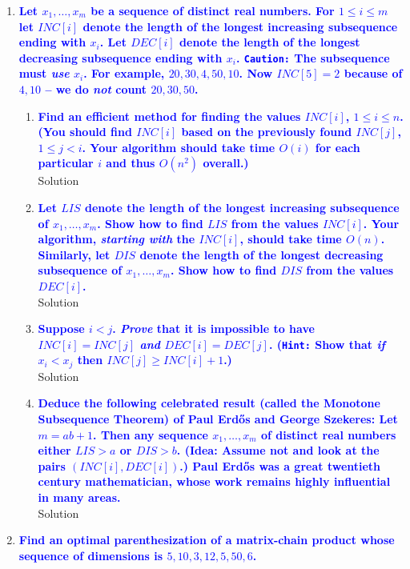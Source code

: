 \documentclass[11pt]{article}
\begin{document}
\begin{enumerate}
    
\item \textbf{\textcolor{blue}{Let $x_1,\ldots,x_m$ be a sequence of distinct real numbers. For $1\leq i\leq m$ let $INC[i]$ denote the length of the longest
increasing subsequence ending with $x_i$.  Let $DEC[i]$ denote the 
length of the longest decreasing subsequence ending with $x_i$.  
{\tt Caution:} The subsequence must {\em use} $x_i$.  For example,
$20,30,4,50, 10$.  Now $INC[5]=2$ because of $4,10$ -- we do
{\em not} count $20,30,50$.}}
    \begin{enumerate}
    \item \textbf{\textcolor{blue}{Find an efficient method for finding the values $INC[i]$, $1\leq i\leq n$. (You should find $INC[i]$ based on the previously found $INC[j]$, $1\leq j< i$.  Your algorithm should take time $O(i)$ for each
    particular $i$ and thus $O(n^2)$ overall.)}}
        \\ Solution
    \item \textbf{\textcolor{blue}{Let $LIS$ denote the length of the longest increasing subsequence of $x_1,\ldots,x_m$.  Show how to find $LIS$ from
    the values $INC[i]$. Your algorithm, {\em starting with} the $INC[i]$,
    should take time $O(n)$. Similarly, let $DIS$ denote the length of the longest
    decreasing subsequence of $x_1,\ldots,x_m$.  Show how to find $DIS$ from
    the values $DEC[i]$. }}
        \\ Solution
    \item \textbf{\textcolor{blue}{Suppose $i<j$.  {\em Prove} that it is impossible to have $INC[i]=INC[j]$ {\em and} $DEC[i]=DEC[j]$.  ({\tt Hint:} Show that {\em if} $x_i < x_j$ then $INC[j] \geq INC[i] + 1$.)}}
        \\ Solution
    \item \textbf{\textcolor{blue}{Deduce the following celebrated result (called the Monotone Subsequence Theorem) of Paul Erd\H{o}s and George Szekeres:  Let $m=ab+1$.  Then any sequence $x_1,\ldots,x_m$ of distinct real numbers either $LIS>a$ or $DIS>b$.  (Idea: Assume not and look at the pairs $(INC[i],DEC[i])$.)  Paul Erd\H{o}s was a great twentieth century mathematician,  whose work remains highly influential in many areas.}}
        \\ Solution
    \end{enumerate}
    
    
\item \textbf{\textcolor{blue}{Find an optimal parenthesization of a matrix-chain product whose sequence of dimensions is $5,10,3,12,5,50,6$.}}
    

\end{enumerate}
\end{document}
